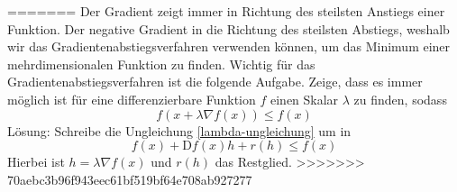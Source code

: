 =======
Der Gradient zeigt immer in Richtung des steilsten Anstiegs einer Funktion. Der negative Gradient in die Richtung des steilsten Abstiegs, weshalb wir das Gradientenabstiegsverfahren verwenden können, um das Minimum einer mehrdimensionalen Funktion zu finden. Wichtig für das Gradientenabstiegsverfahren ist die folgende Aufgabe.
Zeige, dass es immer möglich ist für eine differenzierbare Funktion $f$ einen Skalar $\lambda$ zu finden, sodass
\begin{equation}\label{lambda-ungleichung}f(x + \lambda \nabla f(x)) \leq f(x)\end{equation} 
Lösung:
Schreibe die Ungleichung \eqref{lambda-ungleichung} um in
\begin{equation*}
f(x) + \text{D} f(x)h + r(h) \leq f(x)
\end{equation*}
Hierbei ist $h = \lambda \nabla f(x)$ und $r(h)$ das Restglied.
>>>>>>> 70aebc3b96f943eec61bf519bf64e708ab927277


